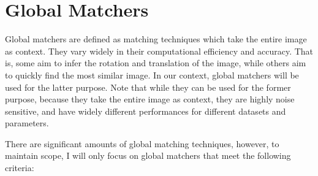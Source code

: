 

\section*{Global Matchers}

Global matchers are defined as matching techniques which take the entire image as context. They vary widely in their computational efficiency and accuracy. That is, some aim to infer the rotation and translation of the image, while others aim to quickly find the most similar image. In our context, global matchers will be used for the latter purpose. Note that while they can be used for the former purpose, because they take the entire image as context, they are highly noise sensitive, and have widely different performances for different datasets and parameters. 


There are significant amounts of global matching techniques, however, to maintain scope, I will only focus on global matchers that meet the following criteria:



